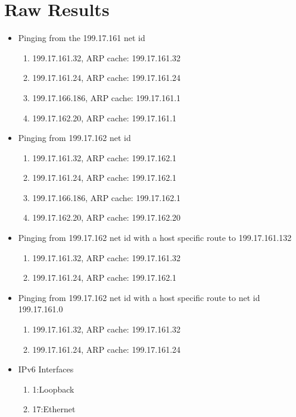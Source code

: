 \documentclass[prb,preprint]{revtex4-1}
\begin{document}
\section{Raw Results}
\begin{itemize}
	\item Pinging from the 199.17.161 net id
	\begin{enumerate}
		\item     199.17.161.32, ARP cache: 199.17.161.32 
		\item     199.17.161.24, ARP cache: 199.17.161.24 
		\item     199.17.166.186, ARP cache: 199.17.161.1 
		\item     199.17.162.20, ARP cache: 199.17.161.1 
	\end{enumerate}
	
	\item Pinging from 199.17.162 net id
	\begin{enumerate}
		\item     199.17.161.32, ARP cache: 199.17.162.1 
		\item     199.17.161.24, ARP cache: 199.17.162.1 
		\item     199.17.166.186, ARP cache: 199.17.162.1 
		\item     199.17.162.20, ARP cache: 199.17.162.20 
	\end{enumerate}

	\item Pinging from 199.17.162 net id with a host specific route to 199.17.161.132
	\begin{enumerate}
		\item     199.17.161.32, ARP cache: 199.17.161.32 
		\item     199.17.161.24, ARP cache: 199.17.162.1 
	\end{enumerate}

	\item Pinging from 199.17.162 net id with a host specific route to net id 199.17.161.0
	\begin{enumerate}
		\item     199.17.161.32, ARP cache: 199.17.161.32 
		\item     199.17.161.24, ARP cache: 199.17.161.24 
	\end{enumerate}

	\item IPv6 Interfaces
	\begin{enumerate}
		\item 1:Loopback
		\item 17:Ethernet
	\end{enumerate}
	

\end{itemize}
\end{document}

